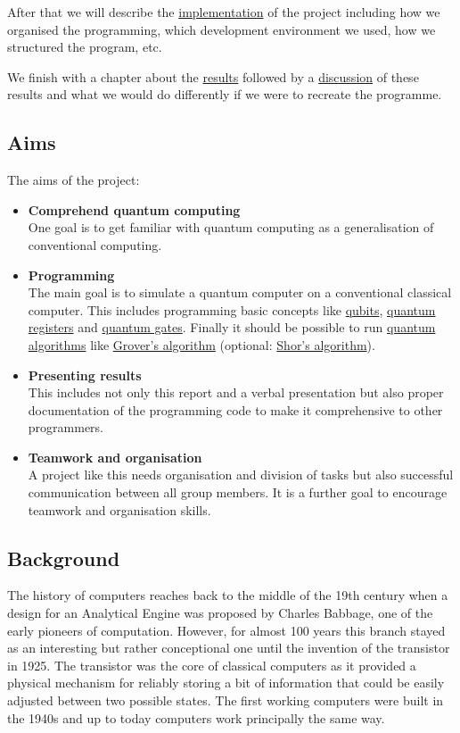 \documentclass[bibliography=totocnumbered, 10pt]{article}
\theoremstyle{NoticeStyle}
\begin{document}
After that we will describe the \hyperref[sec:Implementation]{implementation} of the project including how we organised the programming, which development environment we used, how we structured the program, etc.

We finish with a chapter about the \hyperref[sec:Results]{results} followed by a \hyperref[sec:Discussion]{discussion} of these results and what we would do differently if we were to recreate the programme.


\subsection{Aims}\label{sec:Aims}

The aims of the project:
\begin{itemize}
	\item \textbf{Comprehend quantum computing}\\
	One goal is to get familiar with quantum computing as a generalisation of conventional computing.
	\item \textbf{Programming}\\
	The main goal is to simulate a quantum computer on a conventional classical computer. This includes programming basic concepts like \hyperref[sec:Qubits]{qubits}, \hyperref[sec:Quantum register]{quantum registers} and \hyperref[sec:Quantum gates]{quantum gates}. Finally it should be possible to run \hyperref[sec:Quantum algorithms]{quantum algorithms} like \hyperref[sec:Grover]{Grover's algorithm} (optional: \hyperref[sec:Shor]{Shor's algorithm}).
	\item \textbf{Presenting results}\\
	This includes not only this report and a verbal presentation but also proper documentation of the programming code to make it comprehensive to other programmers.
	\item \textbf{Teamwork and organisation}\\
	A project like this needs organisation and division of tasks but also successful communication between all group members. It is a further goal to encourage teamwork and organisation skills.
\end{itemize} 

\subsection{Background}\label{sec:Background}

The history of computers reaches back to the middle of the 19th century when a design for an Analytical Engine
was proposed by Charles Babbage, one of the early pioneers of computation. However, for almost 100 years this branch stayed as an interesting but rather conceptional one until the invention of the transistor in 1925. The transistor was the core of classical computers as it provided a physical mechanism for reliably storing a bit of information that could be easily adjusted between two possible states. The first working computers were built in the 1940s and up to today computers work principally the same way. 
\end{document}
